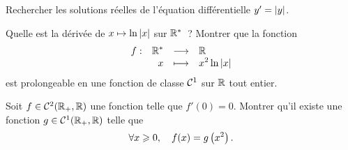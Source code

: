 \documentclass{magnolia}
\begin{document}






Rechercher les solutions réelles de l'équation
différentielle $y'=\left|y\right|$.












\begin{questions}
\question Quelle est la dérivée de $x\mapsto \ln\left|x\right|$ sur ${\mathbb{R}^*}$~?
\question Montrer que la fonction
  \[\begin{array}[t]{lrcl} \displaystyle{f} : & \displaystyle{{\mathbb{R}^*}} & \longrightarrow & \displaystyle{\mathbb{R}} \\ & \displaystyle{x} & \longmapsto & \displaystyle{x^2 \ln\left|x\right|} \end{array}\]
  est prolongeable en une fonction de classe $\mathcal{C}^{1}$ sur $\mathbb{R}$ tout entier.
\end{questions}

Soit $f\in\mathcal{C}^{2}(\mathbb{R}_+,\mathbb{R})$ une fonction telle que $f'(0)=0$. Montrer qu'il existe
une fonction $g\in\mathcal{C}^{1}(\mathbb{R}_+,\mathbb{R})$ telle que
\[\forall x\geqslant 0,\quad f(x)=g\left(x^2\right).\]
\end{document}
